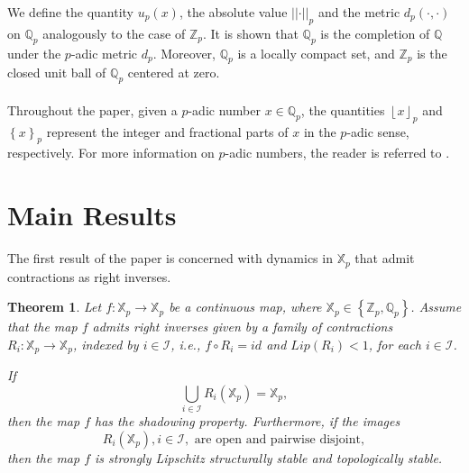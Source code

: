 \documentclass[a4paper, 12pt]{article}
\newtheorem{theorem}{Theorem}[section]
\theoremstyle{definition}
\begin{document}
	We define the quantity $u_{p} \left(  x  \right) $, the absolute value $ \left| \left|  \cdot  \right|  \right|_{p}$ and the metric $d_{p} \left(  \cdot, \cdot  \right) $  on $\mathbb{Q}_{p}$ analogously to the case of $\mathbb{Z}_{p}$.  It is shown that $\mathbb{Q}_{p}$ is the completion of $\mathbb{Q} $ under the $p$-adic metric $d_{p}$. Moreover, $\mathbb{Q}_{p}$ is a locally compact set, and $\mathbb{Z}_{p}$ is the closed unit ball of $\mathbb{Q}_{p}$ centered at zero. 
	
	\paragraph{} 
	Throughout the paper, given a $p$-adic number $x \in \mathbb{Q}_{p}$, the quantities $ \left\lfloor  x   \right\rfloor_{p}$ and $ \left\{  x  \right\}_{p}$ represent the integer and fractional parts of $x$ in the $p$-adic sense, respectively.
	For more information on $p$-adic numbers, the reader is referred to \cite{Robert-A_Course_in_p-adic_Analysis}. 
	
	
	
	\paragraph{}
	
	
	
	
	
	\section{Main Results}\label{Sec_Main Results}
	
	The first result of the paper is concerned with dynamics in $\mathbb{X}_{p}$ that admit contractions as right inverses. 
	
	\begin{theorem}\label{Theor1_Dilations in p-adics} 
		Let $f:\mathbb{X}_p \to \mathbb{X}_p$ be a continuous map, where $\mathbb{X}_{p} \in  \left\{  \mathbb{Z}_{p}, \mathbb{Q}_{p}  \right\} $. Assume that the map $f$ admits right inverses given by a family of contractions  $R_{i}:\mathbb{X}_p\rightarrow \mathbb{X}_p$, indexed by $i \in \mathcal{I}$, i.e., $f\circ R_{i} = id $ and  $ Lip  \left(  R_{i}  \right)  <1$, for each $i \in \mathcal{I}$.
		
		If 
		\begin{equation}\label{Eq1_Inverses Covering Property}
			\bigcup_{i \in \mathcal{I}} R_{i} \left(  \mathbb{X}_{p}  \right)    =   \mathbb{X}_{p} ,
		\end{equation}
		then the map $f$ has the shadowing property.
		Furthermore, if the images 
		\begin{equation}\label{Eq1_Inverses Topological Property}
			R_{i} \left(  \mathbb{X}_{p}  \right) ,   i \in \mathcal{I},   \text{ are open and pairwise disjoint},
		\end{equation}
		then the map $f$ is strongly Lipschitz structurally stable and topologically stable. 
	\end{theorem}
	
\end{document}
